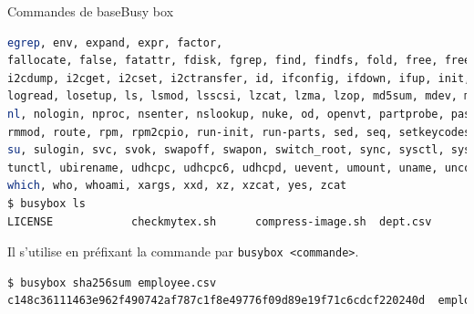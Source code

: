 \documentclass{beamer}
\begin{document}
    \begin{frame}[fragile]{Commandes de base}{Busy box}
        \begin{lstlisting}[language=bash,basicstyle=\tiny\ttfamily]
egrep, env, expand, expr, factor,
fallocate, false, fatattr, fdisk, fgrep, find, findfs, fold, free, freeramdisk, fsfreeze, fstrim, ftpget, ftpput, getopt, getty, grep, groups, gunzip, gzip, halt, head, hexdump, hostid, hostname, httpd, hwclock, i2cdetect,
i2cdump, i2cget, i2cset, i2ctransfer, id, ifconfig, ifdown, ifup, init, insmod, ionice, ip, ipcalc, kill, killall, klogd, last, less, link, linux32, linux64, linuxrc, ln, loadfont, loadkmap, logger, login, logname,
logread, losetup, ls, lsmod, lsscsi, lzcat, lzma, lzop, md5sum, mdev, microcom, mim, mkdir, mkdosfs, mke2fs, mkfifo, mknod, mkpasswd, mkswap, mktemp, modinfo, modprobe, more, mount, mt, mv, nameif, nbd-client, nc, netstat,
nl, nologin, nproc, nsenter, nslookup, nuke, od, openvt, partprobe, passwd, paste, patch, pidof, ping, ping6, pivot_root, poweroff, printf, ps, pwd, rdate, readlink, realpath, reboot, renice, reset, resume, rev, rm, rmdir,
rmmod, route, rpm, rpm2cpio, run-init, run-parts, sed, seq, setkeycodes, setpriv, setsid, sh, sha1sum, sha256sum, sha3sum, sha512sum, shred, shuf, sleep, sort, ssl_client, start-stop-daemon, stat, static-sh, strings, stty,
su, sulogin, svc, svok, swapoff, swapon, switch_root, sync, sysctl, syslogd, tac, tail, tar, taskset, tc, tee, telnet, telnetd, test, tftp, time, timeout, top, touch, tr, traceroute, traceroute6, true, truncate, ts, tty,
tunctl, ubirename, udhcpc, udhcpc6, udhcpd, uevent, umount, uname, uncompress, unexpand, uniq, unix2dos, unlink, unlzma, unshare, unxz, unzip, uptime, usleep, uudecode, uuencode, vconfig, vi, w, watch, watchdog, wc, wget,
which, who, whoami, xargs, xxd, xz, xzcat, yes, zcat
$ busybox ls
LICENSE            checkmytex.sh      compress-image.sh  dept.csv           employee.csv       sqlite-hr.sh       venv
        \end{lstlisting}
        Il s'utilise en préfixant la commande par \lstinline{busybox <commande>}.
        \begin{lstlisting}[language=bash,basicstyle=\tiny\ttfamily]
$ busybox sha256sum employee.csv
c148c36111463e962f490742af787c1f8e49776f09d89e19f71c6cdcf220240d  employee.csv
        \end{lstlisting}
    \end{frame}
\end{document}
